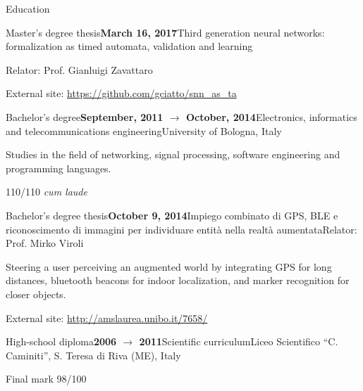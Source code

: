 \documentclass{resume} %
\begin{document}
\begin{rSection}{Education}
\begin{rSubsection}{Master's degree thesis}{\textbf{March 16, 2017}}{Third generation neural networks: formalization as timed automata, validation and learning}{\begin{flushright}
			Relator: Prof. Gianluigi Zavattaro
		\end{flushright}}
	\item External site: \url{https://github.com/gciatto/snn_as_ta}
\end{rSubsection}
\begin{rSubsection}{Bachelor's degree}{\textbf{September, 2011 $\rightarrow$ October, 2014}}{Electronics, informatics and telecommunications engineering}{University of Bologna, Italy}
	\item Studies in the field of networking, signal processing, software engineering and programming languages.
	\item 110/110 \emph{cum laude}
\end{rSubsection}

\begin{rSubsection}{Bachelor's degree thesis}{\textbf{October 9, 2014}}{Impiego combinato di GPS, BLE e riconoscimento di immagini per individuare entità nella realtà aumentata}{Relator: Prof. Mirko Viroli}
	
	\item Steering a user perceiving an augmented world by integrating GPS for long distances, bluetooth beacons for indoor localization, and marker recognition for closer objects.
	
	\item External site: \url{http://amslaurea.unibo.it/7658/}
\end{rSubsection}

\begin{rSubsection}{High-school diploma}{\textbf{2006 $\rightarrow$ 2011}}{Scientific curriculum}{Liceo Scientifico ``C. Caminiti'', S. Teresa di Riva (ME), Italy}
	\item Final mark 98/100
\end{rSubsection}

\end{rSection}

\end{document}
